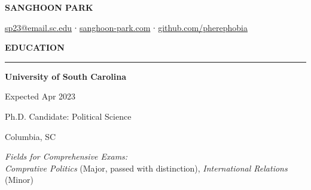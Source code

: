 \documentclass[
  16,
]{article}
\author{}
\date{}
\begin{document}
\ifdefined\Shaded\renewenvironment{Shaded}{\begin{tcolorbox}[interior hidden, enhanced, boxrule=0pt, sharp corners, breakable, frame hidden, borderline west={3pt}{0pt}{shadecolor}]}{\end{tcolorbox}}\fi

\begin{huge}\begin{center}{\bf SANGHOON PARK}\end{center}\end{huge}

\begin{center}
{\faEnvelope}\href{sp23@email.sc.edu}{\ttfamily sp23@email.sc.edu} ∙
{\faLink} \href{sanghoon-park.com}{\ttfamily sanghoon-park.com} ∙ 
{\faGithub} \href{https://github.com/pherephobia}{\ttfamily github.com/pherephobia}
\end{center}
\vspace{15pt}

\vspace{3pt}
\begin{large}
 {\bf EDUCATION}
  \vspace{3pt}
  \hrule
  \begin{multicols}{2}
    \begin{flushleft}{\bf University of South Carolina}\end{flushleft}
    \begin{flushright}Expected Apr 2023\end{flushright}
  \end{multicols}
  \vspace{-0.17cm}
  \begin{multicols}{2}
    \begin{flushleft}Ph.D. Candidate: Political Science\end{flushleft}
    \begin{flushright}Columbia, SC\end{flushright}
  \end{multicols}
  \vspace{-0.25cm}
  \hspace{3pt}\textit{Fields for Comprehensive Exams:}\\
  \vspace{-0.25cm}
  \hspace{6pt}\textit{Comprative Politics} (Major, passed with distinction), \textit{International Relations} (Minor)
\end{large}
\vspace{3pt}
\end{document}
